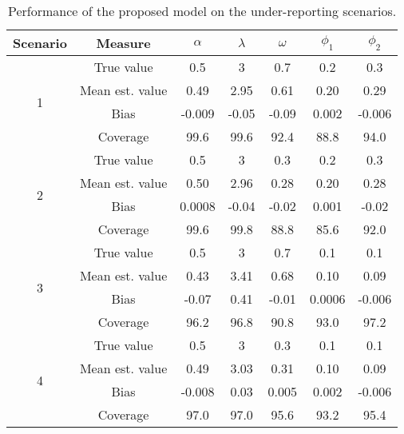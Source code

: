\documentclass[Afour,sageh,times]{sagej}
\begin{document}
\begin{table}[ht]\caption{Performance of the proposed model on the under-reporting scenarios.}
  \centering
  \small
  \begin{tabular}{ ccccccc }
      \hline
   \textbf{Scenario} & \textbf{Measure} & \textbf{$\alpha$} & \textbf{$\lambda$} & \textbf{$\omega$} & \textbf{$\phi_1$} & \textbf{$\phi_2$}\\
   \hline
   \multirow{4}{*}{1} & True value & 0.5 & 3 & 0.7 & 0.2 & 0.3 \\
   & Mean est. value & 0.49 & 2.95 & 0.61 & 0.20 & 0.29 \\
   & Bias & -0.009 & -0.05 & -0.09 & 0.002 & -0.006 \\
   & Coverage & 99.6 & 99.6 & 92.4 & 88.8 & 94.0 \\
   \hline
   \multirow{4}{*}{2} & True value & 0.5 & 3 & 0.3 & 0.2 & 0.3 \\
   & Mean est. value & 0.50 & 2.96 & 0.28 & 0.20 & 0.28 \\
   & Bias & 0.0008 & -0.04 & -0.02 & 0.001 & -0.02 \\
   & Coverage & 99.6 & 99.8 & 88.8 & 85.6 & 92.0 \\
   \hline
   \multirow{4}{*}{3} & True value & 0.5 & 3 & 0.7 & 0.1 & 0.1 \\
   & Mean est. value & 0.43 & 3.41 & 0.68 & 0.10 & 0.09 \\
   & Bias & -0.07 & 0.41 & -0.01 & 0.0006 & -0.006 \\
   & Coverage & 96.2 & 96.8 & 90.8 & 93.0 & 97.2 \\
   \hline
   \multirow{4}{*}{4} & True value & 0.5 & 3 & 0.3 & 0.1 & 0.1 \\
   & Mean est. value & 0.49 & 3.03 & 0.31 & 0.10 & 0.09 \\
   & Bias & -0.008 & 0.03 & 0.005 & 0.002 & -0.006 \\
   & Coverage & 97.0 & 97.0 & 95.6 & 93.2 & 95.4 \\
   \hline
  \end{tabular}
\end{table}
\end{document}
